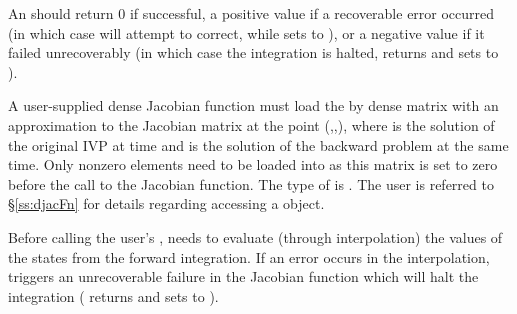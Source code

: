 {
  An  should return 0 if successful, a positive value if a recoverable
  error occurred (in which case {\idas} will attempt to correct, while {\idadense} sets
   to ), or a negative 
  value if it failed unrecoverably (in which case the integration is halted, 
  returns  and {\idadense} sets  to 
  ).
}
{
  A user-supplied dense Jacobian function must load the  by 
  dense matrix  with an approximation to the Jacobian matrix
  at the point (,,), where  is the solution
  of the original IVP at time  and  is the solution of the
  backward problem at the same time.
  Only nonzero elements need to be loaded into  as this matrix 
  is set to zero before the call to the Jacobian function. 
  The type of  is . The user is referred to 
  \S\ref{ss:djacFn} for details regarding accessing a  object.

  {\warn}Before calling the user's , {\idas} needs to evaluate
  (through interpolation) the values of the states from the forward integration. 
  If an error occurs in the interpolation, {\idas} triggers an unrecoverable
  failure in the Jacobian function which will halt the integration
  ( returns  and {\idadense} sets  to 
  ).
}

